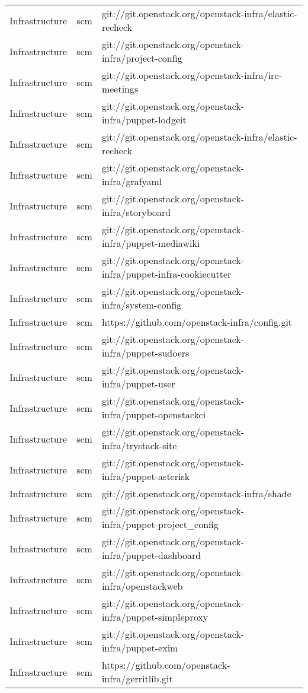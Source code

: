 \begin{center}
\begin{longtable}{|p{4cm}|p{1cm}|p{10cm}|}
Infrastructure&scm&git://git.openstack.org/openstack-infra/elastic-recheck\\ 
Infrastructure&scm&git://git.openstack.org/openstack-infra/project-config\\ 
Infrastructure&scm&git://git.openstack.org/openstack-infra/irc-meetings\\ 
Infrastructure&scm&git://git.openstack.org/openstack-infra/puppet-lodgeit\\ 
Infrastructure&scm&git://git.openstack.org/openstack-infra/elastic-recheck\\ 
Infrastructure&scm&git://git.openstack.org/openstack-infra/grafyaml\\ 
Infrastructure&scm&git://git.openstack.org/openstack-infra/storyboard\\ 
Infrastructure&scm&git://git.openstack.org/openstack-infra/puppet-mediawiki\\ 
Infrastructure&scm&git://git.openstack.org/openstack-infra/puppet-infra-cookiecutter\\ 
Infrastructure&scm&git://git.openstack.org/openstack-infra/system-config\\ 
Infrastructure&scm&https://github.com/openstack-infra/config.git\\ 
Infrastructure&scm&git://git.openstack.org/openstack-infra/puppet-sudoers\\ 
Infrastructure&scm&git://git.openstack.org/openstack-infra/puppet-user\\ 
Infrastructure&scm&git://git.openstack.org/openstack-infra/puppet-openstackci\\ 
Infrastructure&scm&git://git.openstack.org/openstack-infra/trystack-site\\ 
Infrastructure&scm&git://git.openstack.org/openstack-infra/puppet-asterisk\\ 
Infrastructure&scm&git://git.openstack.org/openstack-infra/shade\\ 
Infrastructure&scm&git://git.openstack.org/openstack-infra/puppet-project\_config\\ 
Infrastructure&scm&git://git.openstack.org/openstack-infra/puppet-dashboard\\ 
Infrastructure&scm&git://git.openstack.org/openstack-infra/openstackweb\\ 
Infrastructure&scm&git://git.openstack.org/openstack-infra/puppet-simpleproxy\\ 
Infrastructure&scm&git://git.openstack.org/openstack-infra/puppet-exim\\ 
Infrastructure&scm&https://github.com/openstack-infra/gerritlib.git\\ 

\end{longtable}
\end{center}
